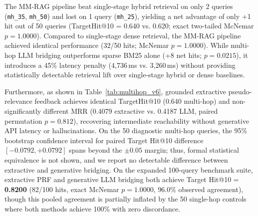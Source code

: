 \documentclass[conference]{IEEEtran}
\begin{document}
\begin{table}[htbp]
\centering
\small
\caption{Exact paired discordant case analysis and two-tailed McNemar tests across the 50 diagnostic multi-hop queries. Comparison of Multi-Hop LLM Bridging against Single-Stage Hybrid, Single-Stage Dense, and Sparse BM25 baselines. While LLM bridging outperforms sparse BM25 alone (+8 net hits, $p = 0.0215$), it yields no statistically detectable retrieval improvement over single-stage hybrid (+1 net hit, $p = 1.000$) or single-stage dense (identical 32/50 hits, $p = 1.000$).}
\label{tab:multihop_paired_v3}
\end{table}

The MM-RAG pipeline beat single-stage hybrid retrieval on only 2 queries (\texttt{mh\_35}, \texttt{mh\_50}) and lost on 1 query (\texttt{mh\_25}), yielding a net advantage of only +1 hit out of 50 queries (TargetHit@10 = 0.640 vs. 0.620; exact two-tailed McNemar $p = 1.0000$). Compared to single-stage dense retrieval, the MM-RAG pipeline achieved identical performance (32/50 hits; McNemar $p = 1.0000$). While multi-hop LLM bridging outperforms sparse BM25 alone (+8 net hits; $p = 0.0215$), it introduces a 45\% latency penalty (4,736\,ms vs. 3,260\,ms) without providing statistically detectable retrieval lift over single-stage hybrid or dense baselines.

Furthermore, as shown in Table~\ref{tab:multihop_v6}, grounded extractive pseudo-relevance feedback achieves identical TargetHit@10 (0.640 multi-hop) and non-significantly different MRR (0.4079 extractive vs. 0.4187 LLM, paired permutation $p = 0.812$), recovering intermediate reachability without generative API latency or hallucinations. On the 50 diagnostic multi-hop queries, the 95\% bootstrap confidence interval for paired Target Hit@10 difference $[-0.0792, +0.0792]$ spans beyond the $\pm 0.05$ margin; thus, formal statistical equivalence is not shown, and we report no detectable difference between extractive and generative bridging. On the expanded 100-query benchmark suite, extractive PRF and generative LLM bridging both achieve Target Hit@10 = \textbf{0.8200} (82/100 hits, exact McNemar $p = 1.0000$, $96.0\%$ observed agreement), though this pooled agreement is partially inflated by the 50 single-hop controls where both methods achieve 100\% with zero discordance.
\end{document}

